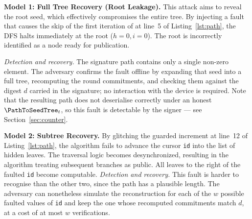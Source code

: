 \noindent\textbf{Model 1: Full Tree Recovery (Root Leakage).}
This attack aims to reveal the root seed, which effectively compromises the entire tree. By injecting a fault that causes the skip of the first iteration of  at line~5 of Listing~\ref{lst:path}, the DFS halts immediately at the root ($h=0, i=0$). The root is incorrectly identified as a node ready for publication.

\noindent\textit{Detection and recovery.} The signature path contains only a
single non-zero element. The adversary confirms the fault offline by expanding
that seed into a full tree, recomputing the round commitments, and checking
them against the digest $d$ carried in the signature; no interaction with the
device is required. Note that the resulting path does not deserialise
correctly under an honest $\PathToSeedTree_t$, so this fault is detectable by
the signer --- see Section~\ref{sec:counter}.

\noindent\textbf{Model 2: Subtree Recovery.}
By glitching the guarded increment  at line~12
of Listing~\ref{lst:path}, the algorithm fails to advance the cursor
\texttt{id} into the list of hidden leaves. The traversal logic becomes desynchronized, resulting in the algorithm treating subsequent branches as public. All leaves to the right of the faulted \texttt{id} become computable.
\noindent\textit{Detection and recovery.} This fault is harder to recognise
than the other two, since the path has a plausible length. The adversary can
nonetheless simulate the reconstruction for each of the $w$ possible faulted
values of \texttt{id} and keep the one whose recomputed commitments match $d$,
at a cost of at most $w$ verifications.

